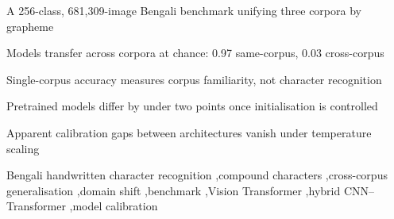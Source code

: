 \documentclass[5p,10pt]{elsarticle}
\begin{document}
\begin{frontmatter}
\begin{highlights}
\item A 256-class, 681,309-image Bengali benchmark unifying three corpora by grapheme
\item Models transfer across corpora at chance: 0.97 same-corpus, 0.03 cross-corpus
\item Single-corpus accuracy measures corpus familiarity, not character recognition
\item Pretrained models differ by under two points once initialisation is controlled
\item Apparent calibration gaps between architectures vanish under temperature scaling
\end{highlights}

\begin{keyword}
Bengali handwritten character recognition \sep compound characters \sep cross-corpus generalisation \sep domain shift \sep benchmark \sep Vision Transformer \sep hybrid CNN--Transformer \sep model calibration
\end{keyword}

\end{frontmatter}




\end{document}
